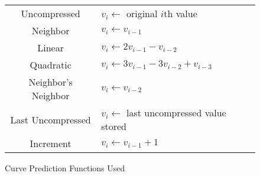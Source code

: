 \begin{figure}
	\centering
	\begin{tabular}{cl}
		Uncompressed & \(v_i \gets \) original \(i\)th value \\
		Neighbor & \(v_i \gets v_{i-1}\) \\
		Linear & \(v_i \gets 2v_{i-1} - v_{i-2}\) \\
		Quadratic & \(v_i \gets 3v_{i-1} - 3v_{i-2} + v_{i-3}\) \\
		Neighbor's Neighbor & \(v_i \gets v_{i-2}\) \\
		Last Uncompressed & \(v_i \gets\) last uncompressed value stored \\
		Increment & \(v_i \gets v_{i-1}+1\)
	\end{tabular}

	\caption{Curve Prediction Functions Used}
	\label{fig:comp-sz-modes}
	
\end{figure}
